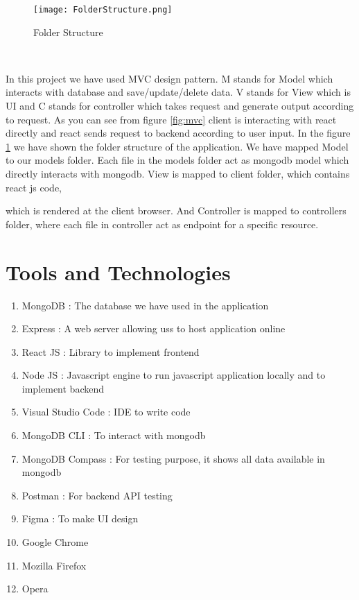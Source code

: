 \documentclass[conference]{IEEEtran}
\begin{document}
\begin{minipage}{3cm}
    \begin{figure}[H]
        \centering
        \texttt{[image: FolderStructure.png]}
        \caption{Folder Structure}
        \label{fig:folderStructure}
    \end{figure}
\end{minipage} \
\begin{minipage}{5.3cm}
    In this project we have used MVC design pattern. M stands for Model which interacts with database and save/update/delete data. V stands for View which is UI and C stands for controller which takes request and generate output according to request. As you can see from figure \ref{fig:mvc} client is interacting with react directly and react sends request to backend according to user input. In the figure \ref{fig:folderStructure} we have shown the folder structure of the application. We have mapped Model to our models folder. Each file in the models folder act as mongodb model which directly interacts with mongodb. View is mapped to client folder, which contains react js code,
\end{minipage}%

\vspace{-0.2cm}
\hspace{3.14cm} which is rendered at the client browser. And Controller is mapped to controllers folder, where each file in controller act as endpoint for a specific resource.








\vspace{0.5cm}
\section{Tools and Technologies}
\begin{enumerate}
    \item MongoDB : The database we have used in the application
    \item Express : A web server allowing uss to host application online
    \item React JS : Library to implement frontend
    \item Node JS : Javascript engine to run javascript application locally and to implement backend
    \item Visual Studio Code : IDE to write code
    \item MongoDB CLI : To interact with mongodb
    \item MongoDB Compass : For testing purpose, it shows all data available in mongodb
    \item Postman : For backend API testing
    \item Figma : To make UI design
    \item Google Chrome
    \item Mozilla Firefox
    \item Opera
\end{enumerate}
\end{document}
